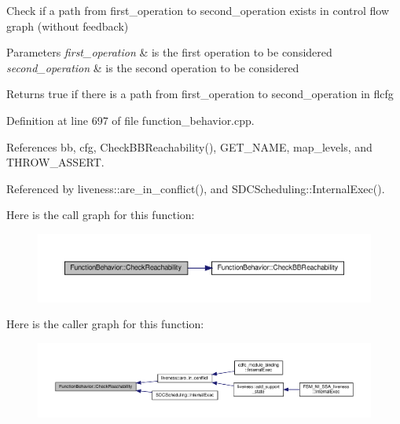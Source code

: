 Check if a path from first\+\_\+operation to second\+\_\+operation exists in control flow graph (without feedback) 


\begin{DoxyParams}{Parameters}
{\em first\+\_\+operation} & is the first operation to be considered \\
\hline
{\em second\+\_\+operation} & is the second operation to be considered \\
\hline
\end{DoxyParams}
\begin{DoxyReturn}{Returns}
true if there is a path from first\+\_\+operation to second\+\_\+operation in flcfg 
\end{DoxyReturn}


Definition at line 697 of file function\+\_\+behavior.\+cpp.



References bb, cfg, Check\+B\+B\+Reachability(), G\+E\+T\+\_\+\+N\+A\+ME, map\+\_\+levels, and T\+H\+R\+O\+W\+\_\+\+A\+S\+S\+E\+RT.



Referenced by liveness\+::are\+\_\+in\+\_\+conflict(), and S\+D\+C\+Scheduling\+::\+Internal\+Exec().

Here is the call graph for this function\+:
\nopagebreak
\begin{figure}[H]
\begin{center}
\leavevmode
\includegraphics[width=350pt]{d9/d45/classFunctionBehavior_abac17bd921424216c7f67c0a7d276c6e_cgraph}
\end{center}
\end{figure}
Here is the caller graph for this function\+:
\nopagebreak
\begin{figure}[H]
\begin{center}
\leavevmode
\includegraphics[width=350pt]{d9/d45/classFunctionBehavior_abac17bd921424216c7f67c0a7d276c6e_icgraph}
\end{center}
\end{figure}
\mbox{\label{classFunctionBehavior_a0cda97f73fb62606acf987bf10232522}} 
